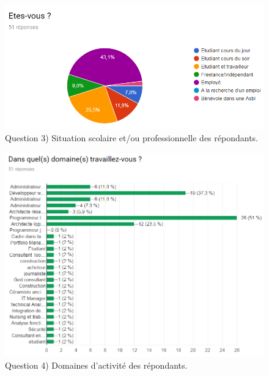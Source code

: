 \documentclass[a4paper,fleqn,12pt,oneside]{book}
\begin{document}
\newpage
{}

\begin{figure}[!ht]
\centering
\includegraphics[scale=1]{figures/QStatus.png}
\caption{Question 3) Situation scolaire et/ou professionnelle des répondants.}
\label{fig:QStatus}
\end{figure}

\begin{figure}[!ht]
\centering
\includegraphics[scale=.8]{figures/QProf.png}
\caption{Question 4) Domaines d'activité des répondants.}
\label{fig:QProf}
\end{figure}

\newpage
{}
\end{document}
